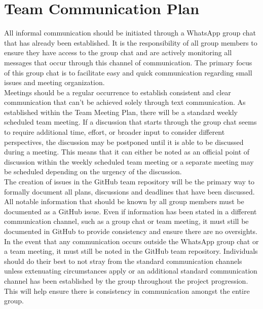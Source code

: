 \documentclass{article}
\begin{document}
\section{Team Communication Plan}

\iffalse
\wss{Issues on GitHub should be part of your communication plan.}
\fi

All informal communication should be initiated through a WhatsApp group chat that has already been established. It
is the responsibility of all group members to ensure they have access to the group chat and are actively monitoring
all messages that occur through this channel of communication. The primary focus of this group chat is to facilitate
easy and quick communication regarding small issues and meeting organization.\\

Meetings should be a regular occurrence to establish consistent and clear communication that can’t be achieved
solely through text communication. As established within the Team Meeting Plan, there will be a standard weekly scheduled
team meeting. If a discussion that starts through the group chat seems to require additional time, effort, or
broader input to consider different perspectives, the discussion may be postponed until it is able to be discussed
during a meeting. This means that it can either be noted as an official point of discussion within the weekly
scheduled team meeting or a separate meeting may be scheduled depending on the urgency of the discussion.\\

The creation of issues in the GitHub team repository will be the primary way to formally document all plans,
discussions and deadlines that have been discussed. All notable information that should be known by all group
members must be documented as a GitHub issue. Even if information has been stated in a different communication channel,
such as a group chat or team meeting, it must still be documented in GitHub to provide consistency and ensure there
are no oversights.\\

In the event that any communication occurs outside the WhatsApp group chat or a team meeting, it must still be
noted in the GitHub team repository. Individuals should do their best to not stray from the standard communication
channels unless extenuating circumstances apply or an additional standard communication channel has been established
by the group throughout the project progression. This will help ensure there is consistency in communication amongst
the entire group.\\
\end{document}
